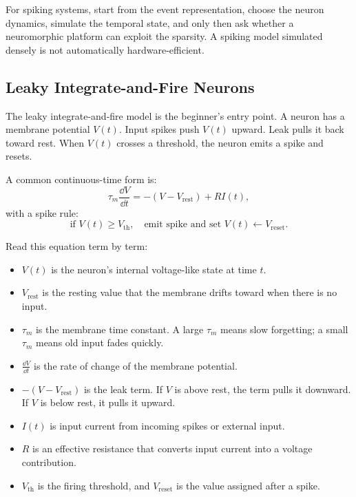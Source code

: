 \begin{aside}
For spiking systems, start from the event representation, choose the neuron dynamics, simulate the temporal state, and only then ask whether a neuromorphic platform can exploit the sparsity. A spiking model simulated densely is not automatically hardware-efficient.
\end{aside}

\subsection{Leaky Integrate-and-Fire Neurons}

The leaky integrate-and-fire model is the beginner's entry point. A neuron has a membrane potential \(V(t)\). Input spikes push \(V(t)\) upward. Leak pulls it back toward rest. When \(V(t)\) crosses a threshold, the neuron emits a spike and resets.

A common continuous-time form is:
\[
  \tau_m \frac{\dd V}{\dd t}
  =
  -(V - V_{\text{rest}}) + R I(t),
\]
with a spike rule:
\[
  \text{if } V(t) \ge V_{\text{th}}, \quad
  \text{emit spike and set } V(t) \leftarrow V_{\text{reset}}.
\]

Read this equation term by term:

\begin{itemize}[leftmargin=*]
  \item \(V(t)\) is the neuron's internal voltage-like state at time \(t\).
  \item \(V_{\text{rest}}\) is the resting value that the membrane drifts toward when there is no input.
  \item \(\tau_m\) is the membrane time constant. A large \(\tau_m\) means slow forgetting; a small \(\tau_m\) means old input fades quickly.
  \item \(\frac{\dd V}{\dd t}\) is the rate of change of the membrane potential.
  \item \(-(V - V_{\text{rest}})\) is the leak term. If \(V\) is above rest, the term pulls it downward. If \(V\) is below rest, it pulls it upward.
  \item \(I(t)\) is input current from incoming spikes or external input.
  \item \(R\) is an effective resistance that converts input current into a voltage contribution.
  \item \(V_{\text{th}}\) is the firing threshold, and \(V_{\text{reset}}\) is the value assigned after a spike.
\end{itemize}

